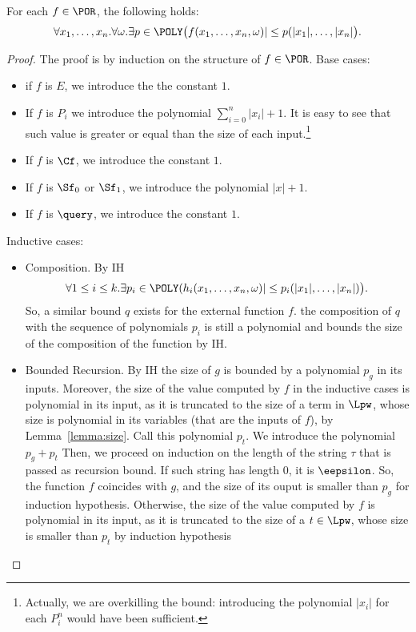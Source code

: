 \begin{lemma}\label{lemma:sizeofterms}
For each $f\in \POR$, the following holds:
$$
\forall x_1,\dots,x_n.\forall \omega.\exists p\in \POLY
\big(f(x_1,\dots, x_n,\omega)| \leq p(|x_1|,\dots, |x_n|\big).
$$
\end{lemma}
\begin{proof}
The proof is by induction on the structure of $f\in \POR$. Base cases:
\begin{itemize}
\item if $f$ is $E$, we introduce the the constant $1$.
%
\item If $f$ is $P_i$ we introduce the polynomial
$\sum^n_{i=0}|x_i|+1$.
It is easy to see that such value is greater or
equal than the size of each input.\footnote{Actually,
we are overkilling the bound: introducing the polynomial
$|x_i|$ for each
$P^n_i$ would have been sufficient.}
%
\item If $f$ is $\Cf$, we introduce the
constant $1$.
%
\item If $f$ is $\Sf_0$ or $\Sf_1$, we introduce the
polynomial $|x|+1$.
%
\item If $f$ is $\query$, we introduce the constant
$1$.
\end{itemize}
Inductive cases:
\begin{itemize}
\item Composition. By IH
$$
\forall 1\leq i\leq k.\exists p_i\in \POLY(h_i(x_1,\dots, x_n,\omega)|
\leq p_i(|x_1|,\dots, |x_n|)\big).
$$
So, a similar bound $q$ exists for the external
function $f$. the composition of $q$
with the sequence of polynomials $p_i$ is
still a polynomial and bounds the size of the composition
of the function by IH.
%
\item Bounded Recursion.
By IH the size of $g$ is bounded by a polynomial
$p_g$ in its inputs. Moreover, the size of the value computed
by $f$ in the inductive cases is polynomial in its input, as
it is truncated to the size of a term in $\Lpw$,
whose size is polynomial in its variables
(that are the inputs of $f$), by Lemma~\ref{lemma:size}.
Call this polynomial $p_t$. We introduce the polynomial $p_g+p_t$
Then, we proceed on induction
on the length of the string $\tau$ that is passed as recursion bound.
If such string has length $0$, it is
$\eepsilon$.
So, the function $f$ coincides with $g$,
and the size of its ouput is smaller than $p_g$ for induction hypothesis.
Otherwise, the size of the value computed
by $f$ is polynomial in its input, as
it is truncated to the size of a $t \in \Lpw$,
whose size is smaller than $p_t$ by induction hypothesis
\end{itemize}
\end{proof}

